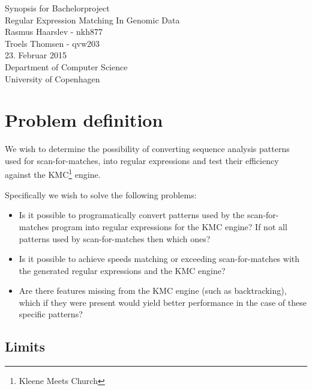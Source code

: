 \documentclass[12pt]{article}
\begin{document}
\begin{titlepage}
    \vspace*{\fill}
    \begin{center}
      {\Huge Synopsis for Bachelorproject}\\[0.7cm]
      {\Large Regular Expression Matching In Genomic Data}\\[0.4cm]
      {\large Rasmus Haarslev - nkh877}\\
      {\large Troels Thomsen - qvw203}\\[0.4cm]
      {\small 23. Februar 2015}\\[0.3cm] 
      {\small Department of Computer Science}\\
      {\small University of Copenhagen}
    \end{center}
    \vspace*{\fill}
\end{titlepage}

\clearpage

\thispagestyle{empty}

\newpage

\section{Problem definition}

We wish to determine the possibility of converting sequence analysis patterns used for scan-for-matches\cite{scan-for-matches}, into regular expressions and test their efficiency against the KMC\footnote{Kleene Meets Church} engine.

Specifically we wish to solve the following problems:

\begin{itemize}
	\item Is it possible to programatically convert patterns used by the scan-for-matches program into regular expressions for the KMC engine? If not all patterns used by scan-for-matches then which ones?
	\item Is it possible to achieve speeds matching or exceeding scan-for-matches with the generated regular expressions and the KMC engine?
	\item Are there features missing from the KMC engine (such as backtracking), which if they were present would yield better performance in the case of these specific patterns?
\end{itemize}

\subsection{Limits}
\end{document}
